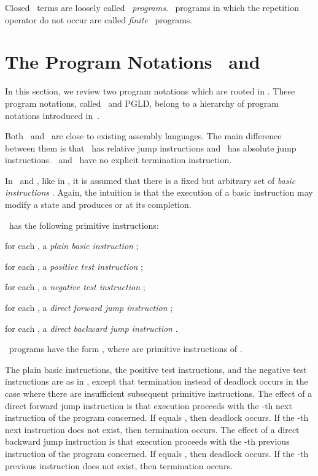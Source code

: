 \documentclass[fleqn]{llncs}
\begin{document}
Closed \PGA\ terms are loosely called \PGA\ \emph{programs}.
\PGA\ programs in which the repetition operator do not occur
are called \emph{finite} \PGA\ programs.

\section{The Program Notations \PGLC\ and \PGLD}
\label{sect-PGLC-PGLD}

In this section, we review two program notations which are rooted in
\PGA.
These program notations, called \PGLC\ and PGLD, belong to a hierarchy
of program notations introduced in~\cite{BL02a}.

Both \PGLC\ and \PGLD\ are close to existing assembly languages.
The main difference between them is that \PGLC\ has relative jump
instructions and \PGLD\ has absolute jump instructions.
\PGLC\ and \PGLD\ have no explicit termination instruction.

In \PGLC\ and \PGLD, like in \PGA, it is assumed that there is a fixed
but arbitrary set of \emph{basic instructions} .
Again, the intuition is that the execution of a basic instruction 
may modify a state and produces  or  at its completion.

\PGLC\ has the following primitive instructions:
\begin{iteml}
\item
for each , a \emph{plain basic instruction} ;
\item
for each , a \emph{positive test instruction} ;
\item
for each , a \emph{negative test instruction} ;
\item
for each , a \emph{direct forward jump instruction}
;
\item
for each , a \emph{direct backward jump instruction}
.
\end{iteml}
\PGLC\ programs have the form , where
 are primitive instructions of \PGLC.

The plain basic instructions, the positive test instructions, and the
negative test instructions are as in \PGA, except that termination
instead of deadlock occurs in the case where there are insufficient
subsequent primitive instructions.
The effect of a direct forward jump instruction  is that
execution proceeds with the -th next instruction of the program
concerned.
If  equals , then deadlock occurs.
If the -th next instruction does not exist, then termination occurs.
The effect of a direct backward jump instruction  is that
execution proceeds with the -th previous instruction of the program
concerned.
If  equals , then deadlock occurs.
If the -th previous instruction does not exist, then termination
occurs.
\end{document}
